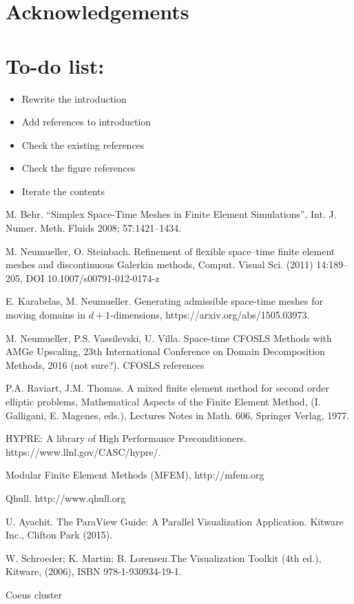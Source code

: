 \documentclass[12pt]{article}
\begin{document}


\section{Acknowledgements}

\section{To-do list:}
\begin{itemize}
	\item Rewrite the introduction
	\item Add references to introduction
	\item Check the existing references
	\item Check the figure references
	\item Iterate the contents
\end{itemize}


\begin{thebibliography}{100}

M. Behr. ``Simplex Space-Time Meshes in Finite Element Simulations'',
Int. J. Numer. Meth. Fluids 2008; 57:1421–1434.

M. Neumueller, O. Steinbach. Refinement of flexible space–time finite element meshes and discontinuous Galerkin methods, Comput. Visual Sci. (2011) 14:189–205, DOI 10.1007/s00791-012-0174-z

E. Karabelas, M. Neumueller. Generating admissible space-time meshes for moving domains in $d + 1$-dimensions, https://arxiv.org/abs/1505.03973.

M. Neumueller, P.S. Vassilevski, U. Villa. Space-time CFOSLS Methods with AMGe Upscaling, 23th International Conference on Domain Decomposition Methods, 2016 (not sure?).
CFOSLS references

P.A. Raviart, J.M. Thomas. A mixed finite element method for second order elliptic problems, Mathematical Aspects of the Finite Element Method, (I. Galligani, E. Magenes, eds.), Lectures Notes in
Math. 606, Springer Verlag, 1977.

HYPRE: A library of High Performance Preconditioners. https://www.llnl.gov/CASC/hypre/.

Modular Finite Element Methods (MFEM), http://mfem.org

Qhull. http://www.qhull.org

U. Ayachit. The ParaView Guide: A Parallel Visualization Application. Kitware Inc., Clifton Park (2015).

W. Schroeder; K. Martin; B. Lorensen.The Visualization Toolkit (4th ed.), Kitware, (2006), ISBN 978-1-930934-19-1.

Coeus cluster

\end{thebibliography}
\end{document}
